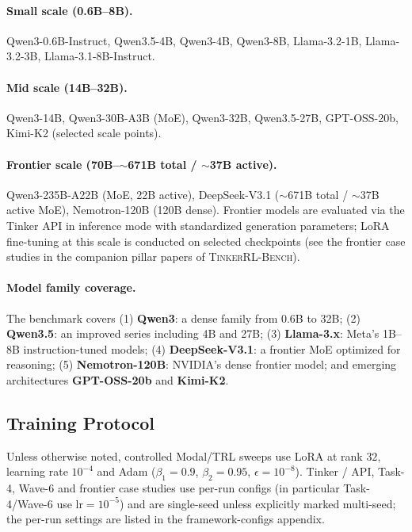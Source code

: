 \documentclass{article}
\newcommand{\ours}{\textsc{TinkerRL-Bench}}
\begin{document}
\paragraph{Small scale (0.6B--8B).}
Qwen3-0.6B-Instruct, Qwen3.5-4B, Qwen3-4B, Qwen3-8B,
Llama-3.2-1B, Llama-3.2-3B, Llama-3.1-8B-Instruct.

\paragraph{Mid scale (14B--32B).}
Qwen3-14B, Qwen3-30B-A3B (MoE), Qwen3-32B, Qwen3.5-27B,
GPT-OSS-20b, Kimi-K2 (selected scale points).

\paragraph{Frontier scale (70B--$\sim$671B total / $\sim$37B active).}
Qwen3-235B-A22B (MoE, 22B active), DeepSeek-V3.1 ($\sim$671B total /
$\sim$37B active MoE), Nemotron-120B (120B dense).
Frontier models are evaluated via the Tinker API in inference mode
with standardized generation parameters; LoRA fine-tuning at this
scale is conducted on selected checkpoints (see the frontier case studies
in the companion pillar papers of \ours{}).

\paragraph{Model family coverage.}
The benchmark covers (1) \textbf{Qwen3}: a dense family from 0.6B to 32B;
(2) \textbf{Qwen3.5}: an improved series including 4B and 27B;
(3) \textbf{Llama-3.x}: Meta's 1B--8B instruction-tuned models;
(4) \textbf{DeepSeek-V3.1}: a frontier MoE optimized for reasoning;
(5) \textbf{Nemotron-120B}: NVIDIA's dense frontier model;
and emerging architectures \textbf{GPT-OSS-20b} and \textbf{Kimi-K2}.

\subsection{Training Protocol}

Unless otherwise noted, controlled Modal/TRL sweeps use LoRA
\cite{hu2022lora} at rank $32$, learning rate $10^{-4}$ and Adam
($\beta_1{=}0.9$, $\beta_2{=}0.95$, $\epsilon{=}10^{-8}$). Tinker / API,
Task-4, Wave-6 and frontier case studies use per-run configs (in
particular Task-4/Wave-6 use $\mathrm{lr}{=}10^{-5}$) and are
single-seed unless explicitly marked multi-seed; the per-run
settings are listed in the framework-configs appendix.
\end{document}
